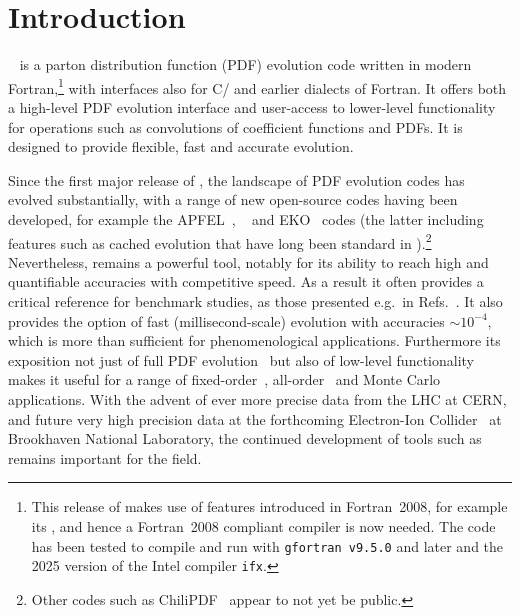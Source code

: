 \documentclass[preprint,1p,a4paper,11pt]{elsarticle}
\begin{document}
\section{Introduction}


\hoppet~\cite{Salam:2008qg} is a parton distribution function (PDF)
evolution code written in modern Fortran,\footnote{This release of
\hoppet makes use of features introduced in Fortran~2008, for example
its , and hence a Fortran~2008 compliant
compiler is now needed. The code has been tested to compile and run
with \texttt{gfortran v9.5.0} and later and the 2025 version of the
Intel compiler \texttt{ifx}.}  with interfaces also for C/\CPP{} and
earlier dialects of Fortran.
%
It offers both a high-level PDF evolution interface and user-access to
lower-level functionality for operations such as convolutions of
coefficient functions and PDFs.
%
It is designed to provide flexible, fast and accurate evolution.

Since the first major release of \hoppet, the landscape of PDF
evolution codes has evolved substantially, with a range of new open-source
codes having been developed, for example the APFEL~\cite{Bertone:2013vaa}, \APFELPP{}~\cite{Bertone:2017gds} and EKO~\cite{Candido:2022tld}
codes (the latter including
features such as cached evolution that have long been standard in
\hoppet).\footnote{Other codes such as ChiliPDF~\cite{Diehl:2021gvs}
  appear to not yet be public.}
%
Nevertheless, \hoppet remains a powerful tool, notably for its ability
to reach high and quantifiable accuracies with competitive speed.
%
As a result it often provides a critical reference for benchmark
studies, as those presented e.g.\ in
Refs.~\cite{Dittmar:2005ed,Bertone:2024dpm}.
%
It also provides the option of fast (millisecond-scale) evolution with
accuracies $\sim 10^{-4}$, which is more than sufficient for
phenomenological applications.
%
%
Furthermore its exposition not just of full PDF evolution~\cite{Lai:2010vv,Gao:2013xoa,Butterworth:2015oua,PDF4LHCWorkingGroup:2022cjn} but also of
low-level functionality makes it useful for a range of fixed-order~\cite{Caola:2019nzf,Asteriadis:2019dte,Bargiela:2022dla},
all-order~\cite{Banfi:2010xy,Dasgupta:2014yra,Banfi:2015pju,Monni:2016ktx,Bizon:2017rah,Buonocore:2024xmy} and Monte Carlo~\cite{Monni:2019whf,vanBeekveld:2023ivn,Buonocore:2024pdv} applications.
%
With the advent of ever more precise data from the LHC at CERN, and
future very high precision data at the forthcoming Electron-Ion
Collider~\cite{AbdulKhalek:2021gbh} at Brookhaven National Laboratory,
the continued development of tools such as \hoppet remains important
for the field.
\end{document}
